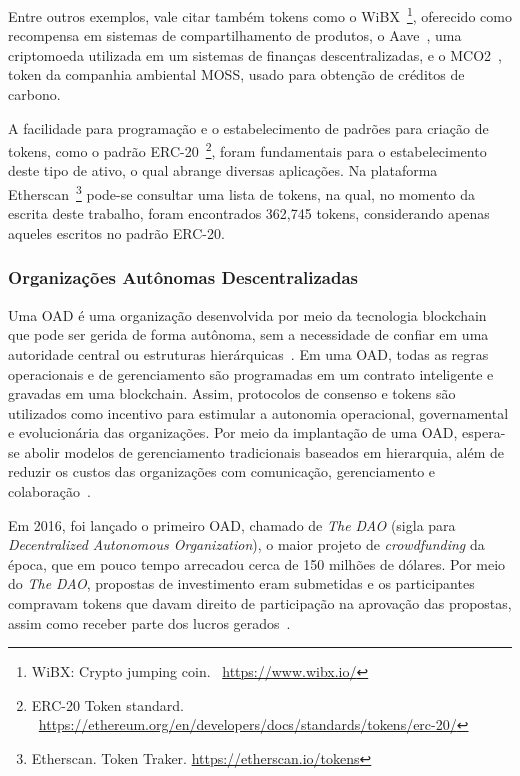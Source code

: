 Entre outros exemplos, vale citar também tokens como o WiBX~\footnote{WiBX: Crypto jumping coin. ~\url{https://www.wibx.io/}}, oferecido como recompensa em sistemas de compartilhamento de produtos, o Aave~\cite{aave-site}, uma criptomoeda utilizada em um sistemas de finanças descentralizadas, e o MCO2~\cite{mco2-moss-whitepaper}, token da companhia ambiental MOSS, usado para obtenção de créditos de carbono. 

A facilidade para programação e o estabelecimento de padrões para criação de tokens, como o padrão ERC-20~\footnote{ERC-20 Token standard. ~\url{https://ethereum.org/en/developers/docs/standards/tokens/erc-20/}}, foram fundamentais para o estabelecimento deste tipo de ativo, o qual abrange diversas aplicações. Na plataforma Etherscan~\footnote{Etherscan. Token Traker. \url{https://etherscan.io/tokens}} pode-se consultar uma lista de tokens, na qual, no momento da escrita deste trabalho, foram encontrados 362,745 tokens, considerando apenas aqueles escritos no padrão ERC-20.

\subsubsection{Organizações Autônomas Descentralizadas} \label{tex:fund:ethereum:app:oad}

Uma OAD é uma organização desenvolvida por meio da tecnologia blockchain que pode ser gerida de forma autônoma, sem a necessidade de confiar em uma autoridade central ou estruturas hierárquicas~\cite{wang2019DAO-survey}. Em uma OAD, todas as regras operacionais e de gerenciamento são programadas em um contrato inteligente e gravadas em uma blockchain. Assim, protocolos de consenso e tokens são utilizados como incentivo para estimular a autonomia operacional, governamental e evolucionária das organizações. Por meio da implantação de uma OAD, espera-se abolir modelos de gerenciamento tradicionais baseados em hierarquia, além de reduzir os custos das organizações com comunicação, gerenciamento e colaboração~\cite{wang2019DAO-survey}.

Em 2016, foi lançado o primeiro OAD, chamado de \textit{The DAO} (sigla para \textit{Decentralized Autonomous Organization}), o maior projeto de \textit{crowdfunding} da época, que em pouco tempo arrecadou cerca de 150 milhões de dólares. Por meio do \textit{The DAO}, propostas de investimento eram submetidas e os participantes compravam tokens que davam direito de participação na aprovação das propostas, assim como receber parte dos lucros gerados~\cite{wang2019DAO-survey}.

